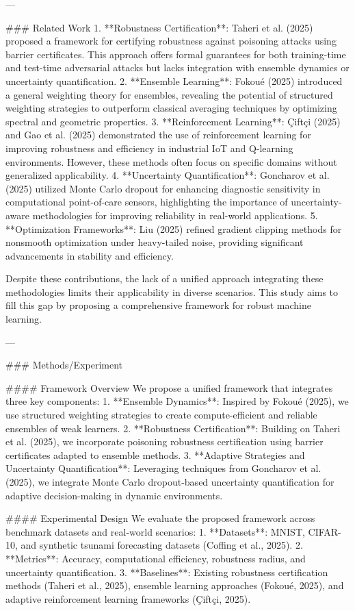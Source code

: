 ---

### Related Work
1. **Robustness Certification**: Taheri et al. (2025) proposed a framework for certifying robustness against poisoning attacks using barrier certificates. This approach offers formal guarantees for both training-time and test-time adversarial attacks but lacks integration with ensemble dynamics or uncertainty quantification.
2. **Ensemble Learning**: Fokoué (2025) introduced a general weighting theory for ensembles, revealing the potential of structured weighting strategies to outperform classical averaging techniques by optimizing spectral and geometric properties.
3. **Reinforcement Learning**: Çiftçi (2025) and Gao et al. (2025) demonstrated the use of reinforcement learning for improving robustness and efficiency in industrial IoT and Q-learning environments. However, these methods often focus on specific domains without generalized applicability.
4. **Uncertainty Quantification**: Goncharov et al. (2025) utilized Monte Carlo dropout for enhancing diagnostic sensitivity in computational point-of-care sensors, highlighting the importance of uncertainty-aware methodologies for improving reliability in real-world applications.
5. **Optimization Frameworks**: Liu (2025) refined gradient clipping methods for nonsmooth optimization under heavy-tailed noise, providing significant advancements in stability and efficiency.

Despite these contributions, the lack of a unified approach integrating these methodologies limits their applicability in diverse scenarios. This study aims to fill this gap by proposing a comprehensive framework for robust machine learning.

---

### Methods/Experiment

#### Framework Overview
We propose a unified framework that integrates three key components:
1. **Ensemble Dynamics**: Inspired by Fokoué (2025), we use structured weighting strategies to create compute-efficient and reliable ensembles of weak learners.
2. **Robustness Certification**: Building on Taheri et al. (2025), we incorporate poisoning robustness certification using barrier certificates adapted to ensemble methods.
3. **Adaptive Strategies and Uncertainty Quantification**: Leveraging techniques from Goncharov et al. (2025), we integrate Monte Carlo dropout-based uncertainty quantification for adaptive decision-making in dynamic environments.

#### Experimental Design
We evaluate the proposed framework across benchmark datasets and real-world scenarios:
1. **Datasets**: MNIST, CIFAR-10, and synthetic tsunami forecasting datasets (Coffing et al., 2025).
2. **Metrics**: Accuracy, computational efficiency, robustness radius, and uncertainty quantification.
3. **Baselines**: Existing robustness certification methods (Taheri et al., 2025), ensemble learning approaches (Fokoué, 2025), and adaptive reinforcement learning frameworks (Çiftçi, 2025).

